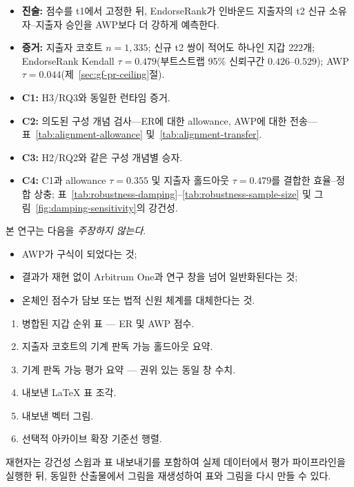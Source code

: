 
\begin{itemize}
\item \textbf{진술:} 점수를 t1에서 고정한 뒤, EndorseRank가 인바운드 지출자의 t2 신규 소유자--지출자 승인을 AWP보다 더 강하게 예측한다.

\item \textbf{증거:} 지출자 코호트 $n=1{,}335$; 신규 t2 쌍이 적어도 하나인 지갑 $222$개; EndorseRank Kendall $\tau=0.479$(부트스트랩 95\% 신뢰구간 $0.426$--$0.529$); AWP $\tau=0.044$(제~\ref{sec:gf-pr-ceiling}절).
\end{itemize}


\begin{itemize}
\item \textbf{C1:} H3/RQ3와 동일한 런타임 증거.
\item \textbf{C2:} 의도된 구성 개념 검사---ER에 대한 allowance, AWP에 대한 전송---표~\ref{tab:alignment-allowance} 및~\ref{tab:alignment-transfer}.
\item \textbf{C3:} H2/RQ2와 같은 구성 개념별 승자.
\item \textbf{C4:} C1과 allowance $\tau=0.355$ 및 지출자 홀드아웃 $\tau=0.479$를 결합한 효율--정합 상충; 표~\ref{tab:robustness-damping}--\ref{tab:robustness-sample-size} 및 그림~\ref{fig:damping-sensitivity}의 강건성.
\end{itemize}


본 연구는 다음을 \emph{주장하지 않는다}.

\begin{itemize}
\item AWP가 구식이 되었다는 것;
\item 결과가 재현 없이 Arbitrum One과 연구 창을 넘어 일반화된다는 것;
\item 온체인 점수가 담보 또는 법적 신원 체계를 대체한다는 것.
\end{itemize}


\begin{enumerate}
\item 병합된 지갑 순위 표 --- ER 및 AWP 점수.
\item 지출자 코호트의 기계 판독 가능 홀드아웃 요약.
\item 기계 판독 가능 평가 요약 --- 권위 있는 동일 창 수치.
\item 내보낸 LaTeX 표 조각.
\item 내보낸 벡터 그림.
\item 선택적 아카이브 확장 기준선 행렬.
\end{enumerate}

재현자는 강건성 스윕과 표 내보내기를 포함하여 실제 데이터에서 평가 파이프라인을 실행한 뒤, 동일한 산출물에서 그림을 재생성하여 표와 그림을 다시 만들 수 있다.
